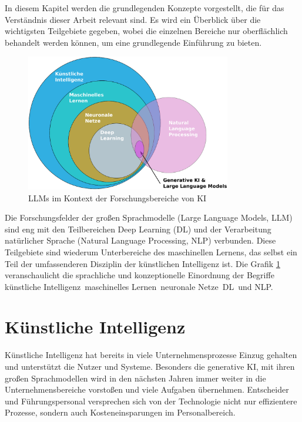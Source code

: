 In diesem Kapitel werden die grundlegenden Konzepte vorgestellt, die für das Verständnis dieser Arbeit relevant sind. Es wird ein Überblick über die wichtigsten Teilgebiete gegeben, wobei die einzelnen Bereiche nur oberflächlich behandelt werden können, um eine grundlegende Einführung zu bieten.

\begin{figure}[!ht]
	\includegraphics[width=0.8\textwidth]{content/chapter_basics/images/einordnung_bezeichnungen.eps}
	\centering
	\caption{LLMs im Kontext der Forschungsbereiche von KI}
	\label{img:classification_of_terms}
\end{figure}

Die Forschungsfelder der großen Sprachmodelle (Large Language Models, \acrshort{LLM}) sind eng mit den Teilbereichen Deep Learning (\acrshort{DL}) und der Verarbeitung natürlicher Sprache (Natural Language Processing, \acrshort{NLP}) verbunden. Diese Teilgebiete sind wiederum Unterbereiche des maschinellen Lernens, das selbst ein Teil der umfassenderen Disziplin der künstlichen Intelligenz ist. Die Grafik \ref{img:classification_of_terms} veranschaulicht die sprachliche und konzeptionelle Einordnung der Begriffe \glqq künstliche Intelligenz\grqq \, \glqq maschinelles Lernen\grqq \, \glqq neuronale Netze\grqq \, \glqq DL\grqq \ und \glqq NLP\grqq .



\section{Künstliche Intelligenz}
Künstliche Intelligenz hat bereits in viele Unternehmensprozesse Einzug gehalten und unterstützt die Nutzer und Systeme. Besonders die generative KI, mit ihren großen Sprachmodellen wird in den nächsten Jahren immer weiter in die Unternehmensbereiche vorstoßen und viele Aufgaben übernehmen. Entscheider und Führungspersonal versprechen sich von der Technologie nicht nur effizientere Prozesse, sondern auch Kosteneinsparungen im Personalbereich.\vspace{0.2cm}

